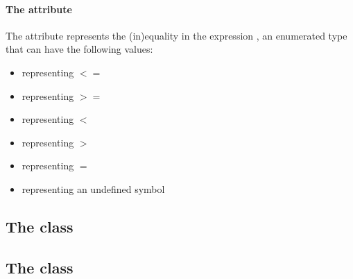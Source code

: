 \paragraph{The  attribute}
The  attribute represents the (in)equality in the expression ,   an enumerated type that can have the following values:
\begin{itemize}
  \item {} representing $<=$ 
  \item {} representing $>=$ 
  \item {} representing $<$
  \item {} representing $>$ 
  \item {} representing $=$
  \item {} representing an undefined symbol
\end{itemize}









\subsection{The  class}
\label{objective-class}
\label{listoffluxobjectives-class}


\subsection{The  class}
\label{fluxobjective-class}


